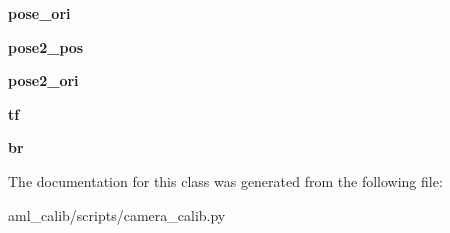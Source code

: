 \begin{DoxyCompactItemize}
{\bfseries pose\+\_\+ori}
\item 
\hypertarget{classscripts_1_1camera__calib_1_1_baxter_eye_hand_calib_adcb4f9d2feb400ef7ca8bb0672d23ea2}{}\label{classscripts_1_1camera__calib_1_1_baxter_eye_hand_calib_adcb4f9d2feb400ef7ca8bb0672d23ea2} 
{\bfseries pose2\+\_\+pos}
\item 
\hypertarget{classscripts_1_1camera__calib_1_1_baxter_eye_hand_calib_accdcaa8aa525885e280f8618040a0927}{}\label{classscripts_1_1camera__calib_1_1_baxter_eye_hand_calib_accdcaa8aa525885e280f8618040a0927} 
{\bfseries pose2\+\_\+ori}
\item 
\hypertarget{classscripts_1_1camera__calib_1_1_baxter_eye_hand_calib_a8c775943efd1fb7730e739366b295027}{}\label{classscripts_1_1camera__calib_1_1_baxter_eye_hand_calib_a8c775943efd1fb7730e739366b295027} 
{\bfseries tf}
\item 
\hypertarget{classscripts_1_1camera__calib_1_1_baxter_eye_hand_calib_a9d083d71d6425de359b3550c16fc97a6}{}\label{classscripts_1_1camera__calib_1_1_baxter_eye_hand_calib_a9d083d71d6425de359b3550c16fc97a6} 
{\bfseries br}
\end{DoxyCompactItemize}


The documentation for this class was generated from the following file\+:\begin{DoxyCompactItemize}
\item 
aml\+\_\+calib/scripts/camera\+\_\+calib.\+py\end{DoxyCompactItemize}
